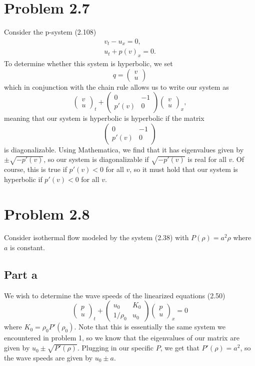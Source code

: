 \documentclass{article}
\begin{document}
\section{Problem 2.7}
Consider the p-system (2.108)
\begin{align*}
v_t-u_x=0,\\
u_t+p(v)_x=0.
\end{align*}
To determine whether this system is hyperbolic, we set
\[
q= \begin{pmatrix}
	v\\u
\end{pmatrix}
\]
which in conjunction with the chain rule allows us to write our system as
\[
\begin{pmatrix}
	v\\u
\end{pmatrix}_t+\begin{pmatrix}
0 &-1\\
p'(v) &0
\end{pmatrix}\begin{pmatrix}
v\\u
\end{pmatrix}_x,
\]
meaning that our system is hyperbolic is hyperbolic if the matrix 
\[
\begin{pmatrix}
	0 &-1\\
	p'(v) &0
\end{pmatrix}
\]
is diagonalizable. Using Mathematica, we find that it has eigenvalues given by $\pm\sqrt{-p'(v)}$, so our system is diagonalizable if $\sqrt{-p'(v)}$ is real for all $v$. Of course, this is true if $p'(v)<0$ for all $v$, so it must hold that our system is hyperbolic if $p'(v)<0$ for all $v$.

\section{Problem 2.8}
Consider isothermal flow modeled by the system (2.38) with $P(\rho)=a^2\rho$ where $a$ is constant. 
\subsection{Part a}
We wish to determine the wave speeds of the linearized equations (2.50)
\[
\begin{pmatrix}
	p\\u
\end{pmatrix}_t+\begin{pmatrix}
	u_0 &K_0\\1/\rho_0 &u_0
\end{pmatrix}\begin{pmatrix}
	p\\u
\end{pmatrix}_x=0
\]
where $K_0=\rho_0P'(\rho_0)$. Note that this is essentially the same system we encountered in problem 1, so we know that the eigenvalues of our matrix are given by $u_0\pm\sqrt{P'(\rho)}$. Plugging in our specific $P$, we get that $P'(\rho)=a^2$, so the wave speeds are given by $u_0\pm a$.
\end{document}
